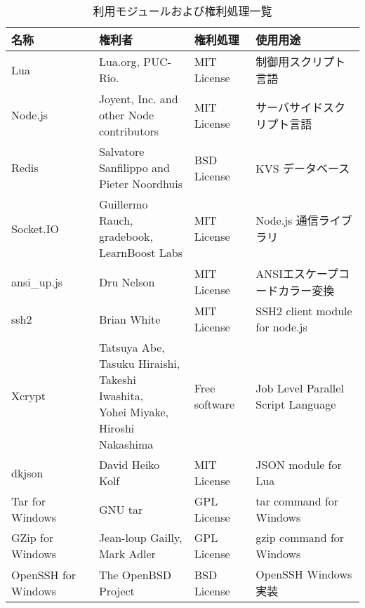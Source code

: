 \documentclass[a4paper,10pt,oneside]{jsbook}
\begin{document}
\begin{table}[htbp]
\begin{center}
\caption{利用モジュールおよび権利処理一覧}
\label{ops}
\begin{tabular}{|l|l|l|l|}
\hline
名称 & 権利者 & 権利処理 & 使用用途 \\
\hline
\hline
Lua & Lua.org, PUC-Rio. & MIT License & 制御用スクリプト言語 \\
\hline
Node.js & \shortstack[l]{Joyent, Inc. and \\ other Node contributors} & MIT License & サーバサイドスクリプト言語 \\
\hline
Redis & \shortstack[l]{Salvatore Sanfilippo and\\ Pieter Noordhuis} & BSD License & KVS データベース \\
\hline
Socket.IO &  \shortstack[l]{ Guillermo Rauch,\\ gradebook,\\ LearnBoost Labs}  & MIT License & Node.js 通信ライブラリ \\
\hline
ansi\_up.js & Dru Nelson  & MIT License & ANSIエスケープコードカラー変換 \\
\hline
ssh2 & Brian White  & MIT License & SSH2 client module for node.js \\
\hline
Xcrypt & \shortstack[l]{ Tatsuya Abe,\\Tasuku Hiraishi,\\Takeshi Iwashita,\\Yohei Miyake,\\Hiroshi Nakashima }  & Free software & Job Level Parallel Script Language \\
\hline
dkjson & David Heiko Kolf & MIT License & JSON module for Lua \\
\hline
Tar for Windows & GNU tar & GPL License & tar command for Windows\\
\hline
GZip for Windows & \shortstack[l]{ Jean-loup Gailly,\\ Mark Adler }& GPL License & gzip command for Windows\\
\hline
OpenSSH for Windows & The OpenBSD Project & BSD License & OpenSSH Windows実装 \\
\hline
\end{tabular}
\end{center}
\end{table}
\end{document}
